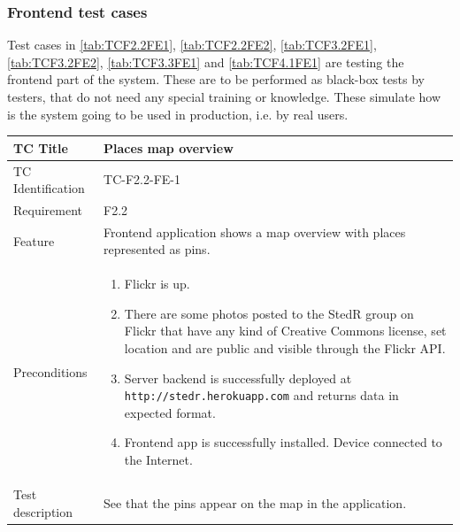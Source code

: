 \documentclass[11pt]{book}
\begin{document}
\subsubsection{Frontend test cases} \label{sec:fe-test-cases}

Test cases in \ref{tab:TCF2.2FE1}, \ref{tab:TCF2.2FE2}, \ref{tab:TCF3.2FE1}, \ref{tab:TCF3.2FE2}, \ref{tab:TCF3.3FE1} and \ref{tab:TCF4.1FE1} are testing the frontend part of the system. These are to be performed as black-box tests by testers, that do not need any special training or knowledge. These simulate how is the system going to be used in production, i.e. by real users.

\begin{table}
  \begin{tabular}{| p{3cm} | p{9.5cm} |} \hline 
    TC Title              & Places map overview \\ \hline 
    TC Identification     & TC-F2.2-FE-1 \\ \hline 
    Requirement           & F2.2 \\ \hline 
    Feature               & Frontend application shows a map overview with places represented as pins. \\ \hline 
    Preconditions         & \begin{enumerate}
                              \item Flickr is up.
                              \item There are some photos posted to the StedR group on Flickr that have any kind of
                               Creative Commons license, set location and are public and visible through the Flickr API.
                              \item Server backend is successfully deployed at \texttt{http://stedr.herokuapp.com} and returns data in expected format.
                              \item Frontend app is successfully installed. Device connected to the Internet.
                            \end{enumerate} \\ \hline 

    Test description      & See that the pins appear on the map in the application.


\end{tabular}
\end{table}
\end{document}
